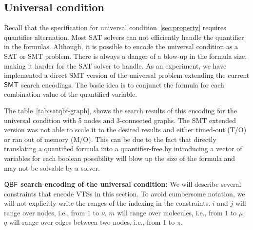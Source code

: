 \subsection{Universal condition}
\label{enc:univ-cond}
%
Recall that the specification for universal condition~\ref{sec:property} requires quantifier alternation. 
%
Most SAT solvers can not efficiently handle the quantifier in the formulas. 
% 
Although, it is possible to encode the universal condition as a SAT or SMT problem.
%
There is always a danger of a blow-up in the formula size, making it harder for the SAT solver to handle. 
% 
As an experiment, we have implemented a direct SMT version of the universal problem extending the current $\mathsf{SMT}$ search encodings.
%
The basic idea is to conjunct the formula for each combination value of the quantified variable. 
%
%

%
The table~\ref{tab:satqbf-graph}, shows the search results of this encoding for the universal condition with 5 nodes and 3-connected graphs. 
%
The SMT extended version was not able to scale it to the desired results and either timed-out (T/O) or ran out of memory (M/O).
%
This can be due to the fact that directly translating a quantified formula into a quantifier-free  by introducing a vector of variables for each boolean possibility will blow up the size of the formula and may not be solvable by a solver.
%

\textbf{$\mathsf{QBF}$ search encoding of the universal condition:}
We will describe several constraints that encode VTSs in this section.
%
To avoid cumbersome notation, we will not explicitly write the ranges
of the indexing in the constraints.
%
$i$ and $j$ will range over nodes, i.e., from $1$ to $\nu$.
%
$m$ will range over molecules, i.e., from $1$ to $\mu$.
%
$q$ will range over edges between two nodes, i.e., from $1$ to $\pi$.
%

